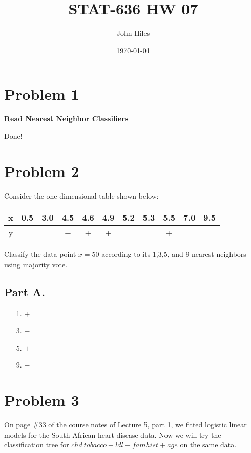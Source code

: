 \documentclass{article}
\title{STAT-636 HW 07}
\author{John Hiles}
\date\today
\begin{document}
\maketitle %


\section*{Problem 1}
\textbf{Read Nearest Neighbor Classifiers}

Done!
\section*{Problem 2}
Consider the one-dimensional table shown below:\\
  \begin{tabular}{c|c|c|c|c|c|c|c|c|c|c}
    \hline
    \hline
    x & 0.5 & 3.0 & 4.5 & 4.6 & 4.9 & 5.2 & 5.3 & 5.5 & 7.0 & 9.5\\
    \hline
    y & - & - & + & + & + & - & - & + & - & -\\
    \hline
    \hline
  \end{tabular}
  
  Classify the data point $x=50$ according to its 1,3,5, and 9 nearest neighbors using majority vote.
\subsection*{Part A.}  
  
  \begin{enumerate}
  \item[1.]
    $+$
  \item[3.]
    $-$
  \item[5.]
    $+$
  \item[9.]
    $-$
  \end{enumerate}
\clearpage
\section*{Problem 3}
On page $\#33$ of the course notes of Lecture 5, part 1, we fitted logistic linear models for the South African heart disease data. Now we will try the classification tree for $chd ~ tobacco +
ldl + famhist + age$ on the same data.
\end{document}
